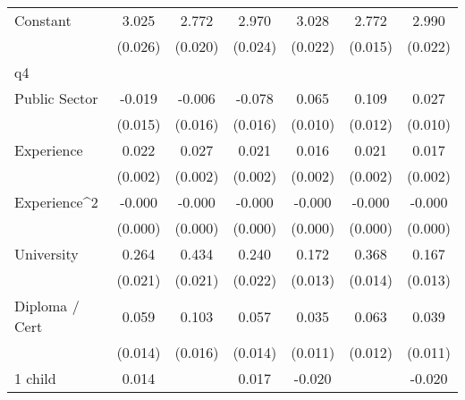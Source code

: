 {\begin{tabular}{l*{6}{c}}
Constant            &       3.025\sym{***}&       2.772\sym{***}&       2.970\sym{***}&       3.028\sym{***}&       2.772\sym{***}&       2.990\sym{***}\\
                    &     (0.026)         &     (0.020)         &     (0.024)         &     (0.022)         &     (0.015)         &     (0.022)         \\
\hline
q4                  &                     &                     &                     &                     &                     &                     \\
Public Sector       &      -0.019         &      -0.006         &      -0.078\sym{***}&       0.065\sym{***}&       0.109\sym{***}&       0.027\sym{***}\\
                    &     (0.015)         &     (0.016)         &     (0.016)         &     (0.010)         &     (0.012)         &     (0.010)         \\
Experience          &       0.022\sym{***}&       0.027\sym{***}&       0.021\sym{***}&       0.016\sym{***}&       0.021\sym{***}&       0.017\sym{***}\\
                    &     (0.002)         &     (0.002)         &     (0.002)         &     (0.002)         &     (0.002)         &     (0.002)         \\
Experience^{2}      &      -0.000\sym{***}&      -0.000\sym{***}&      -0.000\sym{***}&      -0.000\sym{***}&      -0.000\sym{***}&      -0.000\sym{***}\\
                    &     (0.000)         &     (0.000)         &     (0.000)         &     (0.000)         &     (0.000)         &     (0.000)         \\
University          &       0.264\sym{***}&       0.434\sym{***}&       0.240\sym{***}&       0.172\sym{***}&       0.368\sym{***}&       0.167\sym{***}\\
                    &     (0.021)         &     (0.021)         &     (0.022)         &     (0.013)         &     (0.014)         &     (0.013)         \\
Diploma / Cert      &       0.059\sym{***}&       0.103\sym{***}&       0.057\sym{***}&       0.035\sym{***}&       0.063\sym{***}&       0.039\sym{***}\\
                    &     (0.014)         &     (0.016)         &     (0.014)         &     (0.011)         &     (0.012)         &     (0.011)         \\
1 child             &       0.014         &                     &       0.017         &      -0.020\sym{**} &                     &      -0.020\sym{**} \\

\end{tabular}}
